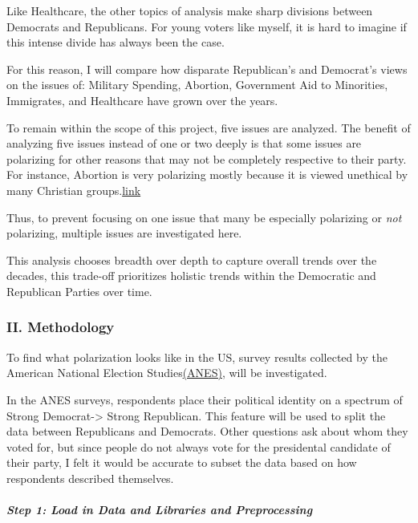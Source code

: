 \documentclass[
]{article}
\begin{document}
Like Healthcare, the other topics of analysis make sharp divisions
between Democrats and Republicans. For young voters like myself, it is
hard to imagine if this intense divide has always been the case.

For this reason, I will compare how disparate Republican's and
Democrat's views on the issues of: Military Spending, Abortion,
Government Aid to Minorities, Immigrates, and Healthcare have grown over
the years.

To remain within the scope of this project, five issues are analyzed.
The benefit of analyzing five issues instead of one or two deeply is
that some issues are polarizing for other reasons that may not be
completely respective to their party. For instance, Abortion is very
polarizing mostly because it is viewed unethical by many Christian
groups.\href{https://www.jstor.org/stable/3511563?seq=1\#metadata_info_tab_contents}{link}

Thus, to prevent focusing on one issue that many be especially
polarizing or \emph{not} polarizing, multiple issues are investigated
here.

This analysis chooses breadth over depth to capture overall trends over
the decades, this trade-off prioritizes holistic trends within the
Democratic and Republican Parties over time.

\hypertarget{ii.-methodology}{%
\subsubsection{\texorpdfstring{\textbf{II. Methodology
}}{II. Methodology }}\label{ii.-methodology}}

To find what polarization looks like in the US, survey results collected
by the American National Election
Studies\href{https://electionstudies.org/}{(ANES)}, will be
investigated.

In the ANES surveys, respondents place their political identity on a
spectrum of Strong Democrat-\textgreater{} Strong Republican. This
feature will be used to split the data between Republicans and
Democrats. Other questions ask about whom they voted for, but since
people do not always vote for the presidental candidate of their party,
I felt it would be accurate to subset the data based on how respondents
described themselves.

\hypertarget{step-1-load-in-data-and-libraries-and-preprocessing}{%
\subparagraph{Step 1: Load in Data and Libraries and
Preprocessing}\label{step-1-load-in-data-and-libraries-and-preprocessing}}
\end{document}
